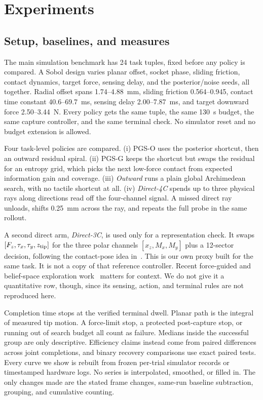 \documentclass[letterpaper,10 pt,conference]{ieeeconf}
\newcommand{\pgso}{\textsc{PGS-O}}
\newcommand{\pgsg}{\textsc{PGS-G}}
\begin{document}
\section{Experiments}

\subsection{Setup, baselines, and measures}

The main simulation benchmark has 24 task tuples, fixed before any policy
is compared.  A Sobol design varies planar offset, socket phase, sliding
friction, contact dynamics, target force, sensing delay, and the
posterior/noise seeds, all together.  Radial offset spans 1.74--4.88~mm,
sliding friction 0.564--0.945, contact time constant 40.6--69.7~ms,
sensing delay 2.00--7.87~ms, and target downward force 2.50--3.44~N.
Every policy gets the same tuple, the same 130~s budget, the same capture
controller, and the same terminal check.  No simulator reset and no budget
extension is allowed.

Four task-level policies are compared.  (i) \pgso{} uses the posterior
shortcut, then an outward residual spiral.  (ii) \pgsg{} keeps the shortcut
but swaps the residual for an entropy grid, which picks the next low-force
contact from expected information gain and coverage.  (iii) \emph{Outward}
runs a plain global Archimedean search, with no tactile shortcut at all.
(iv) \emph{Direct-4C} spends up to three physical rays along directions
read off the four-channel signal.  A missed direct ray unloads, shifts
0.25~mm across the ray, and repeats the full probe in the same rollout.

A second direct arm, \emph{Direct-3C}, is used only for a representation
check.  It swaps $[F_z,\tau_x,\tau_y,z_{\rm tip}]$ for the three polar
channels $[x_z,M_x,M_y]$ plus a 12-sector decision, following the
contact-pose idea in~\cite{jin2021contact}.  This is our own proxy built
for the same task.  It is not a copy of that reference controller.  Recent
force-guided and belief-space exploration
work~\cite{noseworthy2025forge,chintalapudi2026bilevel} matters for
context.  We do not give it a quantitative row, though, since its sensing,
action, and terminal rules are not reproduced here.

Completion time stops at the verified terminal dwell.  Planar path is the
integral of measured tip motion.  A force-limit stop, a protected
post-capture stop, or running out of search budget all count as failure.
Medians inside the successful group are only descriptive.  Efficiency
claims instead come from paired differences across joint completions, and
binary recovery comparisons use exact paired tests.  Every curve we show is
rebuilt from frozen per-trial simulator records or timestamped hardware
logs.  No series is interpolated, smoothed, or filled in.  The only changes
made are the stated frame changes, same-run baseline subtraction, grouping,
and cumulative counting.
\end{document}
